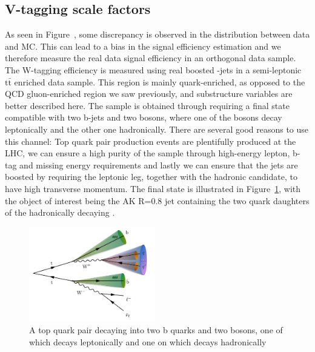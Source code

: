 \subsection{V-tagging scale factors}
\label{sec:searchI:vtag}
As seen in Figure~\label{fig:wtag}, some discrepancy is observed in the \nsubj distribution between data and MC. This can lead to a bias in the signal efficiency estimation and we therefore measure the real data signal efficiency in an orthogonal data sample.
The W-tagging efficiency is measured using real boosted \PW-jets in a semi-leptonic $\textrm{t}\bar{\textrm{t}}$ enriched data sample. This region is mainly quark-enriched, as opposed to the QCD gluon-enriched region we saw previously, and substructure variables are better described here. The sample is obtained through requiring a final state compatible with two b-jets and two \PW bosons, where one of the bosons decay leptonically and the other one hadronically. There are several good reasons to use this channel: Top quark pair production events are plentifully produced at the LHC, we can ensure a high purity of the sample through high-energy lepton, b-tag and missing energy requirements and lastly we can ensure that the \PW jets are boosted by requiring the leptonic leg, together with the hadronic \PW candidate, to have high transverse momentum. The final state is illustrated in Figure~\ref{fig:search2:ttsemilep}, with the object of interest being the AK R=0.8 jet containing the two quark daughters of the hadronically decaying \PW.
\begin{figure}[h!]
\centering
\includegraphics[width=0.49\textwidth]{figures/analysis/search2/misc/semileptt.pdf}
\caption{A top quark pair decaying into two b quarks and two \PW bosons, one of which decays leptonically and one on which decays hadronically}
\label{fig:search2:ttsemilep}
\end{figure}

